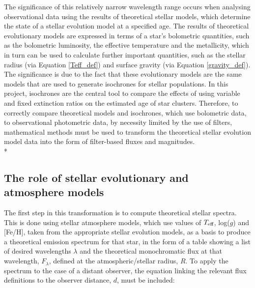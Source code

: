 \documentclass[12pt, a4paper]{report}
\begin{document}
The significance of this relatively narrow wavelength range occurs when analysing observational data using the results of theoretical stellar models, which determine the state of a stellar evolution model at a specified age. The results of theoretical evolutionary models are expressed in terms of a star's bolometric quantities, such as the bolometric luminosity, the effective temperature and the metallicity, which in turn can be used to calculate further important quantities, such as the stellar radius (via Equation \ref{Teff_def}) and surface gravity (via Equation \ref{gravity_def}). The significance is due to the fact that these evolutionary models are the same models that are used to generate isochrones for stellar populations. In this project, isochrones are the central tool to compare the effects of using variable and fixed extinction ratios on the estimated age of star clusters. Therefore, to correctly compare theoretical models and isochrones, which use bolometric data, to observational photometric data, by necessity limited by the use of filters, mathematical methods must be used to transform the theoretical stellar evolution model data into the form of filter-based fluxes and magnitudes.\\*

\subsection{The role of stellar evolutionary and atmosphere models}
The first step in this transformation is to compute theoretical stellar spectra. This is done using stellar atmosphere models, which use values of $T_{\textnormal{eff}}$, log($g$) and [Fe/H], taken from the appropriate stellar evolution models, as a basis to produce a theoretical emission spectrum for that star, in the form of a table showing a list of desired wavelengths $\lambda$ and the theoretical monochromatic flux at that wavelength, $F_{\lambda}$, defined at the atmospheric/stellar radius, $R$. To apply the spectrum to the case of a distant observer, the equation linking the relevant flux definitions to the observer distance, $d$, must be included:
\end{document}
